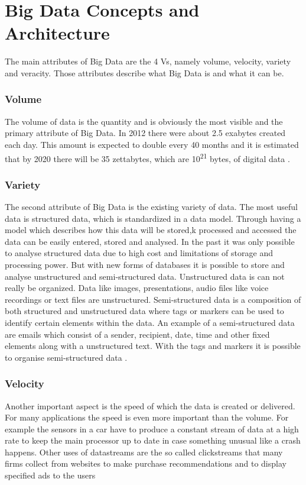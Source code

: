 \documentclass[runningheads]{llncs}
\begin{document}
\section{Big Data Concepts and Architecture}
The main attributes of Big Data are the 4 Vs, namely volume, velocity, variety and veracity. Those attributes describe what Big Data is and what it can be.

\subsubsection{Volume}
The volume of data is the quantity and is obviously the most visible and the primary attribute of Big Data. In 2012 there were about 2.5 exabytes created each day. This amount is expected to double every 40 months \cite{MCAFEE} and it is estimated that by 2020 there will be 35 zettabytes, which are 10\textsuperscript{21} bytes, of digital data \cite{FELDMAN}.

\subsubsection{Variety}
The second attribute of Big Data is the existing variety of data. The most useful data is structured data, which is standardized in a data model. Through having a model which describes how this data will be stored,k processed and accessed the data can be easily entered, stored and analysed. In the past it was only possible to analyse structured data due to high cost and limitations of storage and processing power. But with new forms of databases it is possible to store and analyse unstructured and semi-structured data. Unstructured data is can not really be organized. Data like images, presentations, audio files like voice recordings or text files are unstructured. Semi-structured data is a composition of both structured and unstructured data where tags or markers can be used to identify certain elements within the data. An example of a semi-structured data are emails which consist of a sender, recipient, date, time and other fixed elements along with a unstructured text. With the tags and markers it is possible to organise semi-structured data \cite{BEAL}.

\subsubsection{Velocity}
Another important aspect is the speed of which the data is created or delivered. For many applications the speed is even more important than the volume. For example the sensors in a car have to produce a constant stream of data at a high rate to keep the main processor up to date in case something unusual like a crash happens. Other uses of datastreams are the so called clickstreams that many firms collect from websites to make purchase recommendations and to display specified ads to the users \cite{RUSSOM}
\end{document}
